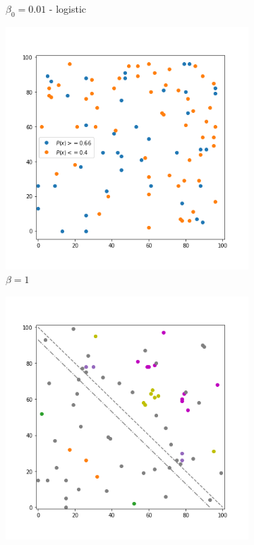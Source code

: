 \begin{figure}[!hb]
\begin{subfigure}{.3\textwidth}
	    \caption{$\beta_0=0.01$ - logistic}
	    \label{fig:23}
    \end{subfigure}%
	\begin{subfigure}{.3\textwidth}
    	\centering
    	\includegraphics[width=1\linewidth]{Bilder/simulation_4_3}
    	\caption{$\beta=1$}
    	\label{fig:24}
	\end{subfigure}
	\begin{subfigure}{.3\textwidth}%
    	\centering
    	\includegraphics[width=1\linewidth]{Bilder/simulation_2_5}

\end{subfigure}
\end{figure}
